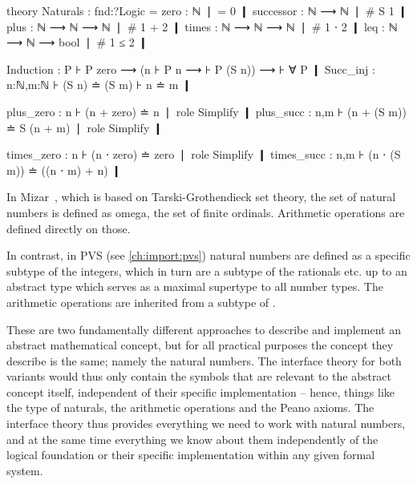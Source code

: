\begin{mmtcode}[caption= {An (excerpt of an) interface theory for natural numbers with \texttt{Logic} as meta-theory\protect\footnotemark},label=fig:natinterface]
theory Naturals : fnd:?Logic =
	zero		:  ℕ ❘ = 0 ❙
  	successor	:  ℕ ⟶ ℕ 		❘ # S 1 ❙
	plus		:  ℕ ⟶ ℕ ⟶ ℕ 		❘ # 1 + 2 ❙
	times		:  ℕ ⟶ ℕ ⟶ ℕ 		❘ # 1 ⋅ 2 ❙
	leq		:  ℕ ⟶ ℕ ⟶ bool 	❘ # 1 ≤ 2 ❙
	
	Induction	: {P} ⊦ P zero ⟶ ({n} ⊦ P n ⟶ ⊦ P (S n)) ⟶ ⊦ ∀ P ❙
	Succ_inj	: {n:ℕ,m:ℕ} ⊦ (S n) ≐ (S m) ⊦ n ≐ m ❙
	
	plus_zero	: {n} ⊦ (n + zero) ≐ n ❘ role Simplify ❙
	plus_succ	: {n,m} ⊦ (n + (S m)) ≐ S (n + m) ❘ role Simplify ❙
	
	times_zero	: {n} ⊦ (n ⋅ zero) ≐ zero ❘ role Simplify ❙
	times_succ	: {n,m} ⊦ (n ⋅ (S m)) ≐ ((n ⋅ m) + n) ❙
\end{mmtcode}

In Mizar~\cite{mizar}, which is based on Tarski-Grothendieck set theory, the set of natural numbers  is defined as \textsf{omega}, the set of finite ordinals. Arithmetic operations are defined directly on those.

In contrast, in PVS (see \autoref{ch:import:pvs}) natural numbers are defined as a specific subtype of the integers, which in turn are a subtype of the rationals etc. up to an abstract type  which serves as a maximal supertype to all number types. The arithmetic operations are inherited from a subtype  of .

These are two fundamentally different approaches to describe and implement an abstract mathematical concept, but for all practical purposes the concept they describe is the same; namely the natural numbers. The interface theory for both variants would thus only contain the symbols that are relevant to the abstract concept itself, independent of their specific implementation -- hence, things like the type of naturals, the arithmetic operations and the Peano axioms. The interface theory thus provides everything we need to work with natural numbers, and at the same time everything we know about them independently of the logical foundation or their specific implementation within any given formal system.

